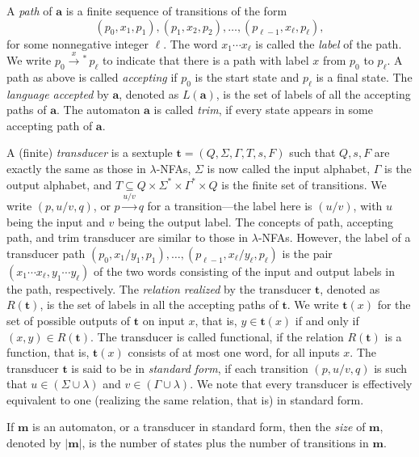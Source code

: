 \documentclass{article}
\theoremstyle{plain}
\theoremstyle{definition}
\theoremstyle{remark}
\newcommand{\xra}[1]{\xrightarrow{#1}}
\newcommand{\xras}[1]{\xrightarrow{#1}\!\!{}^*\,}
\newcommand{\e}{\lambda}
\newcommand{\ew}{\e}
\newcommand\dsid{\ensuremath{\delta}\xspace}
\newcommand\al{\Sigma}        \newcommand\alG{\Gamma}        \newcommand\eew{(\e/\e)}        \newcommand\ealph{E_\al}   \newcommand\aut{\mathbf{a}}   \newcommand\autb{\mathbf{b}}   \newcommand\tr{\mathbf{t}}    \newcommand\sz[1]{|#1|}       \newcommand\weight[1]{\mathrm{weight}(#1)}       \newcommand\ch{\gamma}        \newcommand\chid{\mathrm{id}} \newcommand\chsid{\mathrm{sid}} \newcommand\dist{\dsid}               \newcommand\inp{\mathrm{inp}}
\begin{document}
\par
A \emph{path} of $\aut$ is a finite sequence of transitions of the form
 $$(p_0,x_1,p_1),(p_1,x_2,p_2),\ldots,
 (p_{\ell-1},x_\ell,p_\ell),$$
for some nonnegative integer $\ell$. The word $x_1\cdots x_\ell$ is called the \emph{label} of the path.
We write $p_0\xras{x}p_\ell$ to
indicate that there is a path with label $x$ from $p_0$ to
$p_\ell$.
A path
as above is called \emph{accepting} if
$p_0$ is the start state and $p_\ell$ is a final state. The \emph{language accepted} by $\aut$, denoted as $L(\aut)$, is the set of labels of all the accepting paths of $\aut$. The automaton $\aut$ is called
\emph{trim}, if every state appears in some accepting path of $\aut$.
\par
A (finite) \emph{transducer} \cite{Be:1979,Yu:handbook} is a sextuple $\tr=(Q, \al, \alG, T, s, F)$ such that $Q,s,F$ are exactly the same as those in $\ew$-NFAs, $\al$ is now called the input alphabet, $\alG$ is the output alphabet, and $T\subseteq Q\times\al^*\times\alG^*\times Q$ is the finite set of transitions. We write $(p,u/v,q)$,
or $p\xra{u/v}q$ for a transition---the label here is $(u/v)$, with $u$ being the input and $v$ being the output label. The concepts of path, accepting path, and trim transducer are similar to those in $\ew$-NFAs. However, the label of a
transducer path
$(p_0,x_1/y_1,p_1),\ldots,(p_{\ell-1},x_\ell/y_\ell,p_\ell)$
is the pair $(x_1\cdots x_\ell,
y_1\cdots y_\ell)$ of the two words consisting of the input and output labels in the path, respectively. The \emph{relation realized}
by the transducer $\tr$, denoted as $R(\tr)$, is the set of labels in all the accepting paths of $\tr$.
We write $\tr(x)$ for the set of possible outputs of $\tr$ on input $x$, that is,  $y\in\tr(x)$ if and only if $(x,y)\in R(\tr)$.
The transducer is called functional, if
the relation $R(\tr)$ is a function, that is,
$\tr(x)$ consists of at most one word, for all inputs $x$.
The transducer $\tr$ is said to be in \emph{standard form}, if each transition $(p,u/v,q)$ is such that $u\in(\al\cup\ew)$ and $v\in(\alG\cup\ew)$.
We note that every transducer is effectively equivalent to one (realizing the same relation, that is) in standard form.
\par
If $\mathbf{m}$ is an automaton, or a transducer in standard form, then the \emph{size} of
$\mathbf{m}$, denoted by $\sz{\mathbf{m}}$, is the number of states plus the number
of transitions in $\mathbf{m}$.
\end{document}
